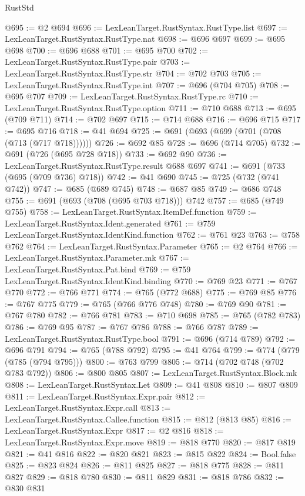 \begin{lexlean}{RustStd}
\begin{coremodule}
@695 := @2 @694
@696 := LexLeanTarget.RustSyntax.RustType.list
@697 := LexLeanTarget.RustSyntax.RustType.nat
@698 := @696 @697
@699 := @695 @698
@700 := @696 @688
@701 := @695 @700
@702 := LexLeanTarget.RustSyntax.RustType.pair
@703 := LexLeanTarget.RustSyntax.RustType.str
@704 := @702 @703
@705 := LexLeanTarget.RustSyntax.RustType.int
@707 := @696 (@704 @705)
@708 := @695 @707
@709 := LexLeanTarget.RustSyntax.RustType.rc
@710 := LexLeanTarget.RustSyntax.RustType.option
@711 := @710 @688
@713 := @695 (@709 @711)
@714 := @702 @697
@715 := @714 @688
@716 := @696 @715
@717 := @695 @716
@718 := @41 @694
@725 := @691 (@693 (@699 (@701 (@708 (@713 (@717 @718))))))
@726 := @692 @85
@728 := @696 (@714 @705)
@732 := @691 (@726 (@695 @728 @718))
@733 := @692 @90
@736 := LexLeanTarget.RustSyntax.RustType.result @688 @697
@741 := @691 (@733 (@695 (@709 @736) @718))
@742 := @41 @690
@745 := @725 (@732 (@741 @742))
@747 := @685 (@689 @745)
@748 := @687 @85
@749 := @686 @748
@755 := @691 (@693 (@708 (@695 @703 @718))) @742
@757 := @685 (@749 @755)
@758 := LexLeanTarget.RustSyntax.ItemDef.function
@759 := LexLeanTarget.RustSyntax.Ident.generated
@761 := @759 LexLeanTarget.RustSyntax.IdentKind.function
@762 := @761 @23
@763 := @758 @762
@764 := LexLeanTarget.RustSyntax.Parameter
@765 := @2 @764
@766 := LexLeanTarget.RustSyntax.Parameter.mk
@767 := LexLeanTarget.RustSyntax.Pat.bind
@769 := @759 LexLeanTarget.RustSyntax.IdentKind.binding
@770 := @769 @23
@771 := @767 @770
@772 := @766 @771
@774 := @765 (@772 @688)
@775 := @769 @85
@776 := @767 @775
@779 := @765 (@766 @776 @748)
@780 := @769 @90
@781 := @767 @780
@782 := @766 @781
@783 := @710 @698
@785 := @765 (@782 @783)
@786 := @769 @95
@787 := @767 @786
@788 := @766 @787
@789 := LexLeanTarget.RustSyntax.RustType.bool
@791 := @696 (@714 @789)
@792 := @696 @791
@794 := @765 (@788 @792)
@795 := @41 @764
@799 := @774 (@779 (@785 (@794 @795)))
@800 := @763 @799
@805 := @714 (@702 @748 (@702 @783 @792))
@806 := @800 @805
@807 := LexLeanTarget.RustSyntax.Block.mk
@808 := LexLeanTarget.RustSyntax.Let
@809 := @41 @808
@810 := @807 @809
@811 := LexLeanTarget.RustSyntax.Expr.pair
@812 := LexLeanTarget.RustSyntax.Expr.call
@813 := LexLeanTarget.RustSyntax.Callee.function
@815 := @812 (@813 @85)
@816 := LexLeanTarget.RustSyntax.Expr
@817 := @2 @816
@818 := LexLeanTarget.RustSyntax.Expr.move
@819 := @818 @770
@820 := @817 @819
@821 := @41 @816
@822 := @820 @821
@823 := @815 @822
@824 := Bool.false
@825 := @823 @824
@826 := @811 @825
@827 := @818 @775
@828 := @811 @827
@829 := @818 @780
@830 := @811 @829
@831 := @818 @786
@832 := @830 @831

\end{coremodule}
\end{lexlean}
